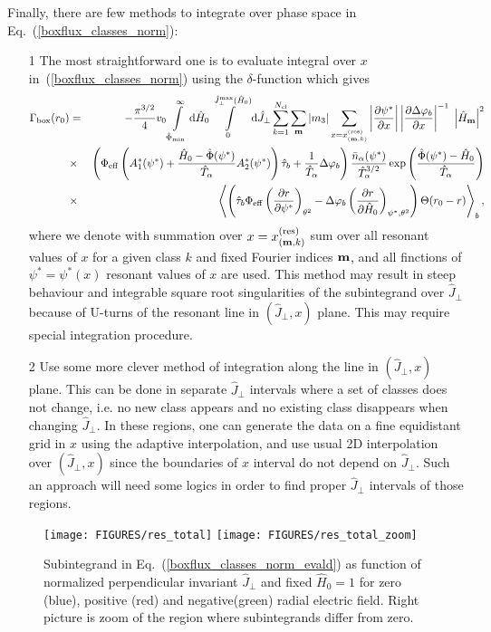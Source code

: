 \documentclass[preprint,prb,aps]{revtex4-1}
\newcommand{\bea}[1]{\begin{eqnarray} \label{#1}}
\newcommand{\eea}{\end{eqnarray}}
\newcommand{\eq}[1]{(\ref{#1})}
\newcommand{\difp}[2]{\frac{\partial #1}{\partial #2}}
\renewcommand{\bm}{{\bf m}}
\newcommand{\rd}{{\rm d}}
\begin{document}
Finally, there are few methods to integrate over phase space
in Eq.~\eq{boxflux_classes_norm}:
\begin{itemize}
\item[1]
The most straightforward one is to evaluate integral over 
$x$ in~\eq{boxflux_classes_norm} using the $\delta$-function which gives
\bea{boxflux_classes_norm_evald}
\Gamma_{\rm box}(r_0) &=&
-\frac{\pi^{3/2}}{4} v_0
\int\limits_{\hat\Phi_{\rm min}}^\infty \rd \hat H_0
\int\limits_0^{\hat J_\perp^{\rm max}(\hat H_0)} \rd \hat J_\perp
\sum\limits_{k=1}^{N_{\rm cl}}
\sum_\bm |m_3|
\sum_{x=x^{(\rm res)}_{(\bm,k)}}
\left|\difp{\psi^\ast}{x}\right|
\left|\difp{\Delta \varphi_b}{x}\right|^{-1}
\;\left|\hat H_{\bm}\right|^2
\nonumber \\
&\times&
\left(
\Phi_{\rm eff}
\left(
A^\ast_1(\psi^\ast)+
\frac{\hat H_0-\hat \Phi(\psi^\ast)}{\hat T_\alpha}
A^\ast_2(\psi^\ast)
\right)
\hat \tau_b
+\frac{1}{\hat T_\alpha}\Delta\varphi_b
\right)
\frac{\bar n_\alpha(\psi^\ast)}{\hat T_\alpha^{3/2}}
\exp\left(\frac{\hat \Phi(\psi^\ast)-\hat H_0}{\hat T_\alpha}\right)
\nonumber \\
&\times&
\left\langle
\left(
\hat\tau_b \Phi_{\rm eff}
\left(\difp{r}{\psi^\ast}\right)_{\theta^2}
-\Delta\varphi_b\left(\difp{r}{\hat H_0}\right)_{\psi^\ast,\theta^2}
\right)\Theta(r_0-r)
\right\rangle_b,
\eea
where we denote with summation over $x=x^{(\rm res)}_{(\bm,k)}$ sum over
all resonant values of $x$ for a given class $k$ and fixed Fourier indices $\bm$,
and all finctions of $\psi^\ast=\psi^\ast(x)$ resonant values of $x$ are used.
This method may result in steep behaviour and integrable square root singularities 
of the subintegrand over $\hat J_\perp$ because of U-turns of the resonant line
in $(\hat J_\perp,x)$ plane. This may require special integration procedure.
\item[2]
Use some more clever method of integration along the line in $(\hat J_\perp,x)$ plane.
This can be done in separate $\hat J_\perp$ intervals where a set of classes does not 
change, i.e. no new class appears and no existing class disappears when changing
$\hat J_\perp$. 
In these regions, one can generate the data on a fine equidistant grid 
in $x$ using the adaptive interpolation, and use usual 2D interpolation over
$(\hat J_\perp,x)$ since the boundaries of $x$ interval do not depend on 
$\hat J_\perp$. Such an approach will need some logics in order to find proper
$\hat J_\perp$ intervals of those regions.

\end{itemize}
%
\begin{figure}[ht]
\centerline{
\texttt{[image: FIGURES/res\_total]}
\texttt{[image: FIGURES/res\_total\_zoom]}
}
\caption[]{
Subintegrand in Eq.~\eq{boxflux_classes_norm_evald} as function of normalized
perpendicular invariant $\hat J_\perp$ and fixed $\hat H_0=1$ 
for zero (blue), positive (red) and 
negative(green) radial electric field. Right picture is zoom of the region where
subintegrands differ from zero.
}
\label{fig:restot}
\end{figure}
\end{document}
